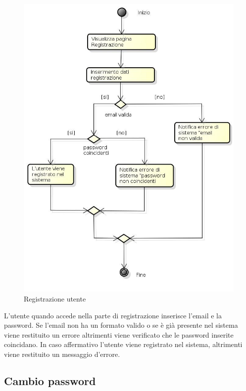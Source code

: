 \begin{figure}[h!]
		\centering
		\includegraphics[scale=.5]{img/Registrazione.jpg}
		\caption{Registrazione utente}
		\label{fig:Registrazione}
\end{figure}

L'utente quando accede nella parte di registrazione inserisce l'email e la password. Se l'email non ha un formato valido o se è già presente nel sistema viene restituito un errore altrimenti viene verificato che le password inserite coincidano. In caso affermativo l'utente viene registrato nel sistema, altrimenti viene restituito un messaggio d'errore.

\newpage

\subsection{Cambio password}

